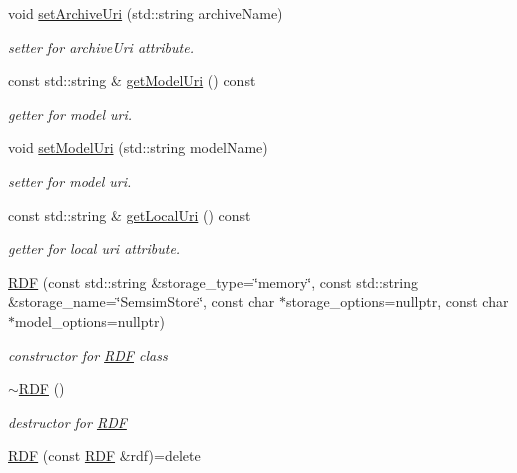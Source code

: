 \begin{DoxyCompactItemize}
void \hyperlink{classomexmeta_1_1RDF_a77ba0cbdb6070ac78f14044197d79cd8}{set\+Archive\+Uri} (std\+::string archive\+Name)
\begin{DoxyCompactList}\small\item\em setter for archive\+Uri attribute. \end{DoxyCompactList}\item 
const std\+::string \& \hyperlink{classomexmeta_1_1RDF_ac579ac8b79eb7d374a9077114837d2ef}{get\+Model\+Uri} () const
\begin{DoxyCompactList}\small\item\em getter for model uri. \end{DoxyCompactList}\item 
void \hyperlink{classomexmeta_1_1RDF_ad5310903d0e1a7a7ee890478f18b6181}{set\+Model\+Uri} (std\+::string model\+Name)
\begin{DoxyCompactList}\small\item\em setter for model uri. \end{DoxyCompactList}\item 
const std\+::string \& \hyperlink{classomexmeta_1_1RDF_a58b64a5972f74564994028504d8d227c}{get\+Local\+Uri} () const
\begin{DoxyCompactList}\small\item\em getter for local uri attribute. \end{DoxyCompactList}\item 
\hyperlink{classomexmeta_1_1RDF_aecb90e51830082f78ff055c045f4b439}{R\+DF} (const std\+::string \&storage\+\_\+type=\char`\"{}memory\char`\"{}, const std\+::string \&storage\+\_\+name=\char`\"{}Semsim\+Store\char`\"{}, const char $\ast$storage\+\_\+options=nullptr, const char $\ast$model\+\_\+options=nullptr)
\begin{DoxyCompactList}\small\item\em constructor for \hyperlink{classomexmeta_1_1RDF}{R\+DF} class \end{DoxyCompactList}\item 
\mbox{\label{classomexmeta_1_1RDF_a87b1eb7fe49f4928e61c399edf49e09c}} 
\hyperlink{classomexmeta_1_1RDF_a87b1eb7fe49f4928e61c399edf49e09c}{$\sim$\+R\+DF} ()
\begin{DoxyCompactList}\small\item\em destructor for \hyperlink{classomexmeta_1_1RDF}{R\+DF} \end{DoxyCompactList}\item 
\hyperlink{classomexmeta_1_1RDF_ad95c4a8588988efe399c7f984e304990}{R\+DF} (const \hyperlink{classomexmeta_1_1RDF}{R\+DF} \&rdf)=delete

\end{DoxyCompactItemize}
